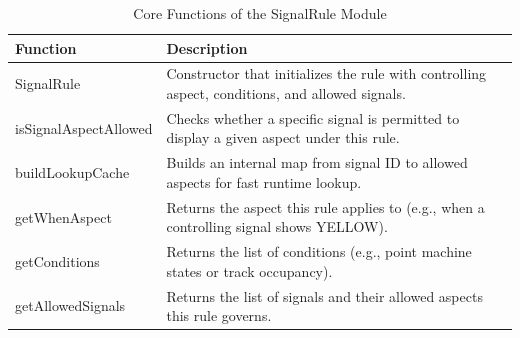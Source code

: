 \begin{table}[H]
    \centering
    \renewcommand{\arraystretch}{1.3}
    \caption{Core Functions of the SignalRule Module}
    \begin{tabular}{p{5.2cm} p{10.2cm}}
        \toprule
        \textbf{Function} & \textbf{Description} \\
        \midrule
        SignalRule & Constructor that initializes the rule with controlling aspect, conditions, and allowed signals. \\
        isSignalAspectAllowed & Checks whether a specific signal is permitted to display a given aspect under this rule. \\
        buildLookupCache & Builds an internal map from signal ID to allowed aspects for fast runtime lookup. \\
        getWhenAspect & Returns the aspect this rule applies to (e.g., when a controlling signal shows YELLOW). \\
        getConditions & Returns the list of conditions (e.g., point machine states or track occupancy). \\
        getAllowedSignals & Returns the list of signals and their allowed aspects this rule governs. \\
        \bottomrule
    \end{tabular}
    \label{tab:signal-rule-functions}
\end{table}
